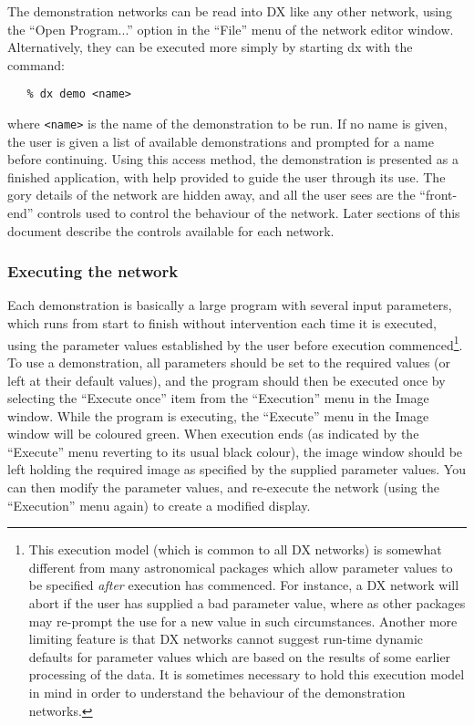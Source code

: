 The demonstration networks can be read into DX like any other network,
using the ``Open Program...'' option in the ``File'' menu of the network
editor window. Alternatively, they can be executed more simply by
starting dx with the command:

\small
\begin{verbatim}
   % dx demo <name>
\end{verbatim}
\normalsize

where {\tt <name>} is the name of the demonstration to be run. If no
name is given, the user is given a list of available demonstrations and
prompted for a name before continuing. Using this access method, the
demonstration is presented as a finished application, with help provided
to guide the user through its use. The gory details of the network are
hidden away, and all the user sees are the ``front-end'' controls used to
control the behaviour of the network. Later sections of this document
describe the controls available for each network.

\subsubsection{Executing the network}
Each demonstration is basically a large program with several input
parameters, which runs from start to finish without intervention each
time it is executed, using the parameter values established by the user
before execution commenced\footnote{This execution model (which is common to all DX networks) is
somewhat different from many astronomical packages which allow parameter
values to be specified {\em after} execution has commenced. For instance,
a DX network will abort if the user has supplied a bad parameter value,
where as other packages may re-prompt the use for a new value in such
circumstances. Another more limiting feature is that DX networks cannot
suggest run-time dynamic defaults for parameter values which are based on
the results of some earlier processing of the data. It is sometimes
necessary to hold this execution model in mind in order to understand
the behaviour of the demonstration networks.}.
To use a demonstration, all parameters should be set to the
required values (or left at their default values), and the program should
then be executed once by selecting the ``Execute once'' item from the
``Execution'' menu in the Image window. While the program is
executing, the ``Execute'' menu in the Image window will be coloured
green. When execution ends (as indicated by the ``Execute'' menu
reverting to its usual black colour), the image window should be left
holding the required image as specified by the supplied parameter values.
You can then modify the parameter values, and re-execute the network
(using the ``Execution'' menu again) to create a modified display.

